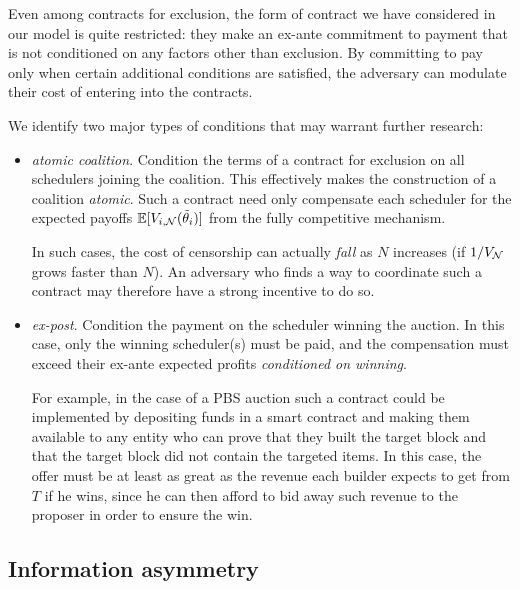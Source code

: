 Even among contracts for exclusion, the form of contract we have considered in our model is quite restricted: they make an ex-ante commitment to payment that is not conditioned on any factors other than exclusion.
%
By committing to pay only when certain additional conditions are satisfied, the adversary can modulate their cost of entering into the contracts.

We identify two major types of conditions that may warrant further research:
%
\begin{itemize}
  \item \emph{atomic coalition}. 
    Condition the terms of a contract for exclusion on all schedulers joining the coalition. 
    This effectively makes the construction of a coalition \emph{atomic}.
    Such a contract need only compensate each scheduler for the expected payoffs $\mathbb{E}[V_{i,\mathcal{N}}(\tilde\theta_i)]$ from the fully competitive mechanism.
    
    In such cases, the cost of censorship can actually \emph{fall} as $N$ increases (if $1/V_{\mathcal{N}}$ grows faster than $N$).
    An adversary who finds a way to coordinate such a contract may therefore have a strong incentive to do so.


  \item \emph{ex-post}.
    Condition the payment on the scheduler winning the auction.
    In this case, only the winning scheduler(s) must be paid, and the compensation must exceed their ex-ante expected profits \emph{conditioned on winning}.

    For example, in the case of a PBS auction \cite{thegostep2021mevboost} such a contract could be implemented by depositing funds in a smart contract and making them available to any entity who can prove that they built the target block and that the target block did not contain the targeted items.
    In this case, the offer must be at least as great as the revenue each builder expects to get from $T$ if he wins, since he can then afford to bid away such revenue to the proposer in order to ensure the win.

\end{itemize}






\subsection{Information asymmetry}
\label{section:asymmetry}


